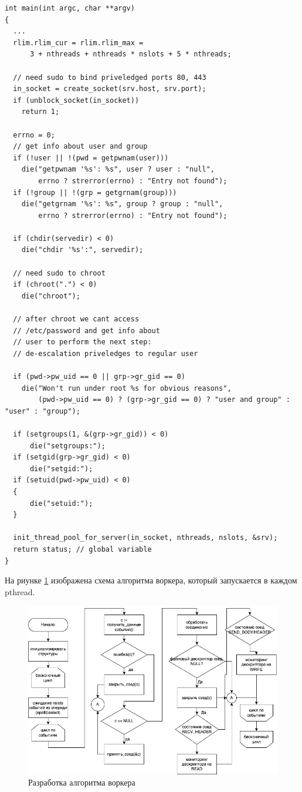 \captionsetup{singlelinecheck = false, justification=raggedright}
\begin{lstlisting}[label=lst:launch,caption=Запуск сервера]
int main(int argc, char **argv)
{
  ...
  rlim.rlim_cur = rlim.rlim_max =
      3 + nthreads + nthreads * nslots + 5 * nthreads;

  // need sudo to bind priveledged ports 80, 443
  in_socket = create_socket(srv.host, srv.port);
  if (unblock_socket(in_socket))
    return 1;

  errno = 0;
  // get info about user and group
  if (!user || !(pwd = getpwnam(user)))
    die("getpwnam '%s': %s", user ? user : "null",
        errno ? strerror(errno) : "Entry not found");
  if (!group || !(grp = getgrnam(group)))
    die("getgrnam '%s': %s", group ? group : "null",
        errno ? strerror(errno) : "Entry not found");

  if (chdir(servedir) < 0)
    die("chdir '%s':", servedir);

  // need sudo to chroot
  if (chroot(".") < 0)
    die("chroot");

  // after chroot we cant access
  // /etc/password and get info about
  // user to perform the next step:
  // de-escalation priveledges to regular user

  if (pwd->pw_uid == 0 || grp->gr_gid == 0)
    die("Won't run under root %s for obvious reasons",
        (pwd->pw_uid == 0) ? (grp->gr_gid == 0) ? "user and group" : "user" : "group");

  if (setgroups(1, &(grp->gr_gid)) < 0)
      die("setgroups:");
  if (setgid(grp->gr_gid) < 0)
      die("setgid:");
  if (setuid(pwd->pw_uid) < 0)
  {
      die("setuid:");
  }

  init_thread_pool_for_server(in_socket, nthreads, nslots, &srv);
  return status; // global variable 
}
\end{lstlisting}

На риунке \ref{img:worker} изображена схема алгоритма воркера, который запускается в каждом pthread.

\begin{figure}[H]
    \begin{center}
        \includegraphics[width=0.95\linewidth]{inc/img/seti_worker.drawio.png}
        \caption{Разработка алгоритма воркера}
        \label{img:worker}
    \end{center}
\end{figure}

